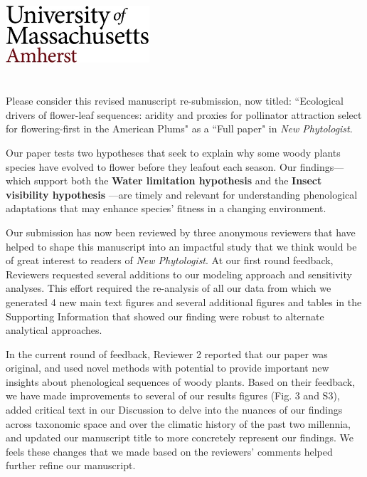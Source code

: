 \documentclass{article}[12pt]
\begin{document}

\noindent\includegraphics[width=0.4\textwidth]{umasslogo}\\\\

\\ %

\noindent Please consider this revised manuscript re-submission, now titled: ``Ecological drivers of flower-leaf sequences: aridity and proxies for pollinator attraction select for flowering-first in the American Plums" as a ``Full paper" in \textit{New Phytologist}.

Our paper tests two hypotheses that seek to explain why some woody plants species have evolved to flower before they leafout each season. Our findings---which support both the \textbf{Water limitation hypothesis} \citep{Gougherty2018,Buonaiuto2020} and the \textbf{Insect visibility hypothesis} \citep{Janzen1967}---are timely and relevant for understanding phenological adaptations that may enhance species' fitness in a changing environment.

Our submission has now been reviewed by three anonymous reviewers that have helped to shape this manuscript into an impactful study that we think would be of great interest to readers of \emph{New Phytologist}. At our first round feedback, Reviewers requested several additions to our modeling approach and sensitivity analyses. This effort required the re-analysis of all our data from which we generated 4 new main text figures and several additional figures and tables in the Supporting Information that showed our finding were robust to alternate analytical approaches.

In the current round of feedback, Reviewer 2 reported that our paper was original, and used novel methods with potential to provide important new insights about phenological sequences of woody plants. Based on their feedback, we have made improvements to several of our results figures (Fig. 3 and S3), added critical text in our Discussion to delve into the nuances of our findings across taxonomic space and over the climatic history of the past two millennia, and updated our manuscript title to more concretely represent our findings. We feels these changes that we made based on the reviewers' comments helped further refine our manuscript.
\end{document}
